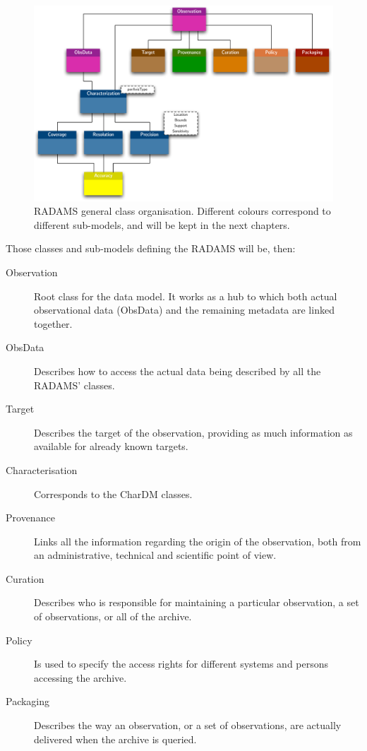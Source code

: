 		\begin{figure}[tbp]
			\begin{center}
			\includegraphics[width=\columnwidth]
				{fig/RADAMS_Complete}
			\caption[RADAMS general class organisation]{
				RADAMS general class organisation. Different colours
				correspond to different sub-models, and will be
				kept in the next chapters.
			}
			\label{RADAMSHLoverview}
			\end{center}
		\end{figure}
		
		Those classes and sub-models defining the RADAMS will be,
		then:
		
		\begin{description}
			\item[Observation] Root class for the data model. It
			works as a hub to which both actual observational data
			(ObsData) and the remaining metadata are linked
			together.
			
			\item[ObsData] Describes how to access the actual
			data being described by all the RADAMS' classes.
			
			\item[Target] Describes the target of the observation,
			providing as much information as available for
			already known targets.
			
			\item[Characterisation] Corresponds to the CharDM
			classes.
			
			\item[Provenance] Links all the information regarding
			the origin of the observation, both from an
			administrative, technical and scientific point of
			view.
			
			\item[Curation] Describes who is responsible for
			maintaining a particular observation, a set of
			observations, or all of the archive.
			
			\item[Policy] Is used to specify the access rights
			for different systems and persons accessing the
			archive.
			
			\item[Packaging] Describes the way an observation,
			or a set of observations, are actually delivered
			when the archive is queried.
		\end{description}
		
